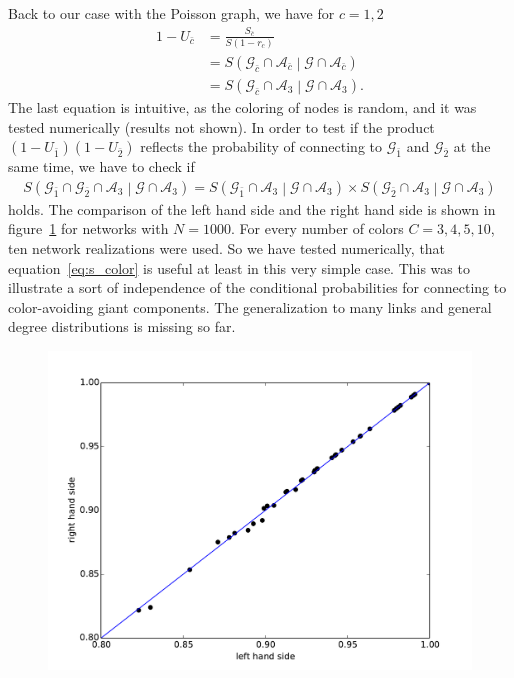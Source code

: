 \documentclass[aps, pre, onecolumn, a4paper, floatfix]{revtex4}
\begin{document}
Back to our case with the Poisson graph, we have for $c=1,2$
\begin{align}
1-U_{\bar c} &=\frac{S_{\bar c}}{S (1-r_c)}\\
 &= S\left({\mathcal G}_{\bar c} \cap {\mathcal A}_{\bar c} \middle| {\mathcal G} \cap {\mathcal A}_{\bar c} \right)\\
 &= S\left({\mathcal G}_{\bar c} \cap {\mathcal A}_{3} \middle| {\mathcal G} \cap {\mathcal A}_{3} \right).
\end{align}
The last equation is intuitive, as the coloring of nodes is random, and it was tested numerically (results not shown). 
In order to test if the product $(1-U_{\bar 1})(1-U_{\bar 2})$ reflects the probability of 
connecting to ${\mathcal G}_{\bar 1}$ and ${\mathcal G}_{\bar 2}$ at the same time, 
we have to check if 
\begin{align}
S\left({\mathcal G}_{\bar 1}\cap {\mathcal G}_{\bar 2} \cap {\mathcal A}_3 \middle| {\mathcal G} \cap {\mathcal A}_3 \right)=
S\left({\mathcal G}_{\bar 1} \cap {\mathcal A}_3 \middle| {\mathcal G} \cap {\mathcal A}_3 \right)\times 
S\left({\mathcal G}_{\bar 2} \cap {\mathcal A}_3 \middle| {\mathcal G} \cap {\mathcal A}_3 \right)
\end{align}
holds. The comparison of the left hand side and the right hand side 
is shown in figure~\ref{fig:corr} for networks with $N=1000$. For every number of colors $C=3,4,5,10$, 
ten network realizations were used. So we have tested numerically, that 
equation~\ref{eq:s_color} is useful at least in this very simple case. This was 
to illustrate a sort of independence of the conditional probabilities for connecting 
to color-avoiding giant components. The generalization to many links and 
general degree distributions is missing so far. 



\begin{figure}[htb]
\begin{center}
	\includegraphics[width=0.6\columnwidth]{finder_C_correlated.pdf}
	\caption{}
	\label{fig:corr}
\end{center}
\end{figure}
\end{document}
